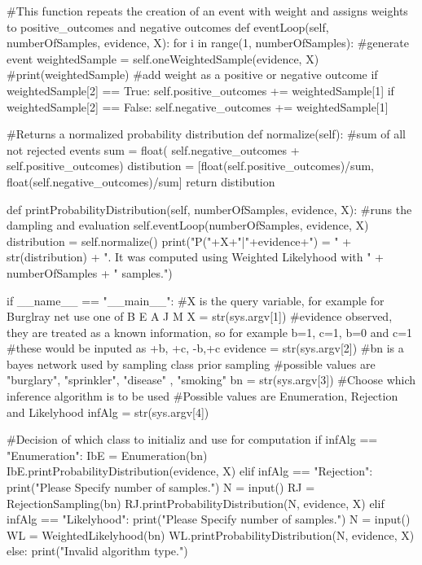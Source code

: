 \documentclass[10pt]{article}
\begin{document}
\begin{spverbatim}
    #This function repeats the creation of an event with weight and assigns weights to positive_outcomes and negative outcomes
    def eventLoop(self,  numberOfSamples, evidence,  X):
        for i in range(1,  numberOfSamples):
            #generate event
            weightedSample = self.oneWeightedSample(evidence, X)
            #print(weightedSample)
            #add weight as a positive or negative outcome
            if weightedSample[2] == True:
                self.positive_outcomes += weightedSample[1]
            if weightedSample[2] == False:
                self.negative_outcomes += weightedSample[1]
    
    #Returns a normalized probability distribution
    def normalize(self):
        #sum of all not rejected events
        sum = float( self.negative_outcomes + self.positive_outcomes)
        distibution = [float(self.positive_outcomes)/sum, float(self.negative_outcomes)/sum]
        return distibution
        

    def printProbabilityDistribution(self, numberOfSamples,  evidence,  X):
        #runs the dampling and evaluation
        self.eventLoop(numberOfSamples,  evidence,  X)
        distribution = self.normalize()
        print("P("+X+"|"+evidence+") = " + str(distribution) + ". It was computed using Weighted Likelyhood with " + numberOfSamples + " samples.")



if __name__ == "__main__":
    #X is the query variable, for example for Burglray net use one of B E A J M
    X = str(sys.argv[1])
    #evidence observed, they are treated as a known information, so for example b=1, c=1, b=0 and c=1
    #these would be inputed as +b, +c, -b,+c
    evidence = str(sys.argv[2])
    #bn is a bayes network used by sampling class prior sampling
    #possible values are "burglary", "sprinkler", "disease" , "smoking"
    bn = str(sys.argv[3])
    #Choose which inference algorithm is to be used
    #Possible values are Enumeration, Rejection and Likelyhood
    infAlg = str(sys.argv[4])
    
    #Decision of which class to initializ and use for computation
    if infAlg == "Enumeration":
        IbE = Enumeration(bn)
        IbE.printProbabilityDistribution(evidence,  X)
    elif infAlg == "Rejection":
        print("Please Specify number of samples.")
        N = input()
        RJ = RejectionSampling(bn)
        RJ.printProbabilityDistribution(N,  evidence,  X)
    elif infAlg == "Likelyhood":
        print("Please Specify number of samples.")
        N = input()
        WL = WeightedLikelyhood(bn)
        WL.printProbabilityDistribution(N, evidence,  X)
    else:
        print("Invalid algorithm type.")
        
\end{spverbatim}
\end{document}
